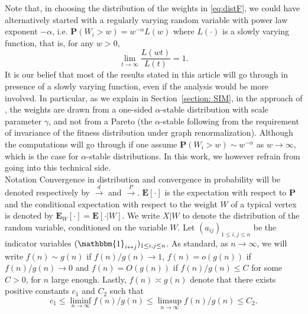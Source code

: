 \documentclass[11pt, reqno]{amsart}
\makeatletter
\numberwithin{equation}{section}
\def\paragraph{\@startsection{paragraph}{4}%
  \z@\z@{-\fontdimen2\font}%
  {\normalfont\itshape}}
\DeclareMathOperator{\one}{\mathbbm{1}} %
\renewcommand{\o}[1]{o\left(#1\right)}
\renewcommand{\O}[1]{O\left(#1\right)}
\theoremstyle{plain} %
\theoremstyle{definition} %
\newcommand{\eps}{\varepsilon}
\newcommand{\prob}{\mathbf{P}}
\newcommand{\E}{\mathbf{E}}
\makeatother
\begin{document}
Note that, in choosing the distribution of the weights in \eqref{eq:distF}, we could have alternatively started with a regularly varying random variable with power law exponent $-\alpha$, i.e. $\prob(W_i>w)= w^{-\alpha} L(w)$ where $L(\cdot)$ is a slowly varying function, that is, for any $w>0$,
$$\lim_{t\to\infty}\frac{L(wt)}{L(t)}=1.$$
It is our belief that  most of the results stated in this article will go through in presence of a slowly varying function, even if the analysis would be more involved.  In particular, as we explain in Section~\ref{section: SIM}, in the approach of \cite{GMD2020}, the weights are drawn from a one-sided $\alpha$-stable distribution with scale parameter $\gamma$, and not from a Pareto (the $\alpha$-stable following from the requirement of invariance of the fitness distribution under graph renormalization). Although the computations will go through if one assume $\prob(W_i>w)\sim w^{-\alpha}$ as $w\to\infty$, which is the case for $\alpha$-stable distributions. In this work, we however refrain from going into this technical side.\\


\paragraph{Notation} 
Convergence in distribution and convergence in probability will be denoted respectively by $\overset{d}\longrightarrow$ and $\overset{P}\longrightarrow$.  
$\E[\cdot]$ is the expectation with respect to $\prob$ and the conditional expectation with respect to the weight $W$ of a typical vertex is denoted by $\E_W[ \cdot]= \E[ \cdot| W]$. We write $X|W$ to denote the distribution of the random variable, conditioned on the variable $W$. Let $(a_{ij})_{1\leq i, j\leq n}$ be the indicator variables
$(\one_{i\leftrightarrow j})_{1\leq i, j\leq n}$.
As standard, as $n\to \infty$, we will write $f(n)\sim g(n)$ if $f(n)/g(n)\to 1$,  $f(n)=\o{g(n)}$ if $f(n)/g(n)\to 0$ and $f(n)=\O{g(n)}$ if $f(n)/g(n)\leq C$ for some $C>0$, for $n$ large enough. Lastly, $f(n)\asymp g(n)$ denote that there exists positive constants $c_1$ and $C_2$ such that 
$$c_1  \le \liminf_{n\to\infty} f(n)/g(n)\le \limsup_{n\to\infty} f(n)/g(n) \le C_2.$$\\


\end{document}
